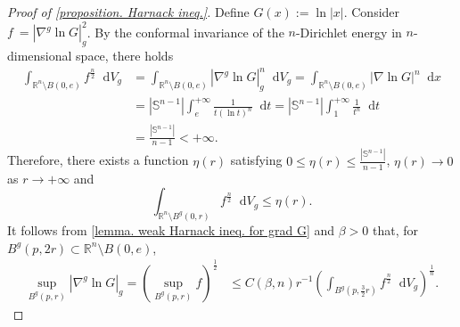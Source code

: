 \documentclass[10pt,a4paper]{amsart}
\numberwithin{equation}{section}
\newcommand{\dd}{\mathop{}\!\mathrm{d}}%
\newcommand{\dx}{\mathop{}\!\mathrm{d}x}
\begin{document}
\begin{proof}[Proof of \cref{proposition. Harnack ineq.}]
    Define $G(x):=\ln |x|$. Consider $f\:=|\nabla^g \ln G|_g^2$.
    By the conformal invariance of the $n$-Dirichlet energy in $n$-dimensional space, there holds
    \begin{align*}
        \int_{\mathbb{R}^n\setminus B(0,e)}f^{\frac{n}{2}}\dd V_g
        &=\int_{\mathbb{R}^n\setminus B(0,e)} |\nabla^g \ln G|_g^n\dd V_g
        =\int_{\mathbb{R}^n\setminus B(0,e)} |\nabla \ln G|^n\dx\\
        &=|\mathbb{S}^{n-1}|\int_e^{+\infty}\frac{1}{t(\ln t)^n}\dd t
        =|\mathbb{S}^{n-1}|\int_1^{+\infty}\frac{1}{t^n}\dd t\\
        &=\frac{|\mathbb{S}^{n-1}|}{n-1}<+\infty.
    \end{align*}
    Therefore, there exists a function $\eta(r)$ satisfying $0\leq \eta(r)\leq \frac{|\mathbb{S}^{n-1}|}{n-1}$, $\eta(r)\to0$ as $r\to +\infty$ and
    \begin{equation}\label{ineq. smallness of integral of f to n/2}
        \int_{\mathbb{R}^n\setminus B^g(0,r)} f^{\frac{n}{2}}\dd V_g
        \leq \eta(r).
    \end{equation}
    It follows from \cref{lemma. weak Harnack ineq. for grad G} and $\beta>0$ that, for 
    $ B^g(p, 2r)\subset \mathbb{R}^n\setminus B(0,e)$,
    \begin{align}\label{ineq. upper bound of gradient of ln G}
        \sup_{B^g(p,r)}|\nabla^g \ln G|_g
    =(\sup_{B^g(p,r)} f)^{\frac{1}{2}}
    &\leq C(\beta,n) r^{-1} (\int_{B^g(p,\frac{3}{2}r)} f^{\frac{n}{2}}\dd V_g )^{\frac{1}{n}}.
    \end{align}


\end{proof}
\end{document}

